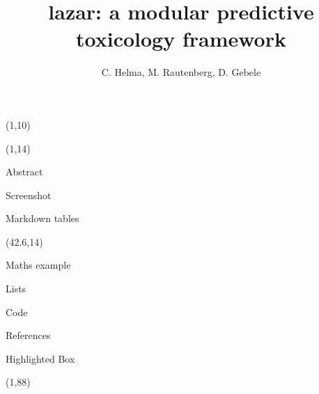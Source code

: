\documentclass[final]{beamer}
\title{lazar: a modular predictive toxicology framework}
\author{C. Helma, M. Rautenberg, D. Gebele}
\institute{\emph{in silico} toxicology gmbh, Basel, Switzerland}
\begin{document}
  \begin{frame}{}

    \begin{textblock}{80}(1,10)
        
    \end{textblock}

    \begin{textblock}{40.5}(1,14)
      \begin{block}{Abstract}
        
      \end{block}

      \begin{block}{Screenshot}
        
      \end{block}

      \begin{block}{Markdown tables}
        
      \end{block}

    \end{textblock}

    \begin{textblock}{40.5}(42.6,14)

      \begin{block}{Maths example}
        
      \end{block}

      \begin{block}{Lists}
        
      \end{block}

      \begin{block}{Code}
        
      \end{block}

      \begin{block}{References}
        \small
      \end{block}

      \begin{alertblock}{Highlighted Box}
        
      \end{alertblock}

    \end{textblock}

    \begin{textblock}{80}(1,88)

      \begin{exampleblock}{}
        
      \end{exampleblock}

    \end{textblock}

  \end{frame}
\end{document}
